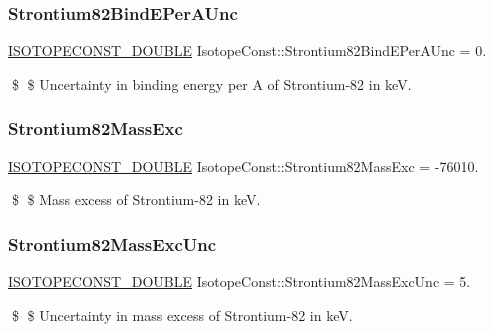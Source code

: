 \subsubsection{\texorpdfstring{Strontium82\+Bind\+E\+Per\+A\+Unc}{Strontium82BindEPerAUnc}}
{\footnotesize\ttfamily \mbox{\hyperlink{group___isotope_const-_macros_ga8f45a7272ce02c0b4c65c44636ed719a}{I\+S\+O\+T\+O\+P\+E\+C\+O\+N\+S\+T\+\_\+\+D\+O\+U\+B\+LE}} Isotope\+Const\+::\+Strontium82\+Bind\+E\+Per\+A\+Unc = 0.}

\$ \$ Uncertainty in binding energy per A of Strontium-\/82 in keV. \mbox{\label{group___isotope_const-_strontium-_sr82_ga7234365e027352cf3762146e723a89aa}} 
\subsubsection{\texorpdfstring{Strontium82\+Mass\+Exc}{Strontium82MassExc}}
{\footnotesize\ttfamily \mbox{\hyperlink{group___isotope_const-_macros_ga8f45a7272ce02c0b4c65c44636ed719a}{I\+S\+O\+T\+O\+P\+E\+C\+O\+N\+S\+T\+\_\+\+D\+O\+U\+B\+LE}} Isotope\+Const\+::\+Strontium82\+Mass\+Exc = -\/76010.}

\$ \$ Mass excess of Strontium-\/82 in keV. \mbox{\label{group___isotope_const-_strontium-_sr82_ga9debd5a318cd784622a8c7e63282bcaa}} 
\subsubsection{\texorpdfstring{Strontium82\+Mass\+Exc\+Unc}{Strontium82MassExcUnc}}
{\footnotesize\ttfamily \mbox{\hyperlink{group___isotope_const-_macros_ga8f45a7272ce02c0b4c65c44636ed719a}{I\+S\+O\+T\+O\+P\+E\+C\+O\+N\+S\+T\+\_\+\+D\+O\+U\+B\+LE}} Isotope\+Const\+::\+Strontium82\+Mass\+Exc\+Unc = 5.}

\$ \$ Uncertainty in mass excess of Strontium-\/82 in keV. \mbox{\label{group___isotope_const-_strontium-_sr82_ga7a0bcb2caa1f24f7f1829eece714a1ff}} 
